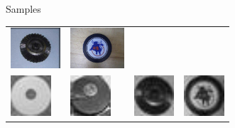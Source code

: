 \documentclass{beamer}
\newcommand{\samplesheight}{1.5cm}
\begin{document}
\begin{frame}{Samples}
\begin{table}[H]
\begin{tabularx}{\textwidth}{@{}XXXX@{}}
			\includegraphics[height=\samplesheight]{training_images/hard_negative/n03208556_13484} &
			\includegraphics[height=\samplesheight]{training_images/hard_negative/n04019541_26831} \\
			\includegraphics[height=\samplesheight]{training_images/hard_negative/n03208556_9694.thumbnail.jpg} &
			\includegraphics[height=\samplesheight]{training_images/hard_negative/n03208556_11973.thumbnail.jpg} &
			\includegraphics[height=\samplesheight]{training_images/hard_negative/n03208556_13484.thumbnail.jpg} &
			\includegraphics[height=\samplesheight]{training_images/hard_negative/n04019541_26831.thumbnail.jpg}
		\end{tabularx}
	\end{table}
\end{frame}
\end{document}
